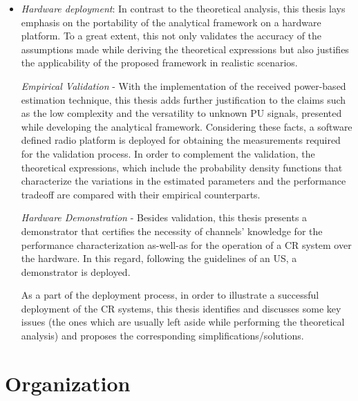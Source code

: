 \begin{itemize}
 
\item \textit{Hardware deployment}: 
In contrast to the theoretical analysis, this thesis lays emphasis on the portability of the analytical framework on a hardware platform. To a great extent, this not only validates the accuracy of the assumptions made while deriving the theoretical expressions but also justifies the applicability of the proposed framework in realistic scenarios. \begin{mdframed}[style=MyFrame] \textit{Empirical Validation} - With the implementation of the received power-based estimation technique, this thesis adds further justification to the claims such as the low complexity and the versatility to unknown PU signals, presented while developing the analytical framework. Considering these facts, a software defined radio platform is deployed for obtaining the measurements required for the validation process. In order to complement the validation, the theoretical expressions, which include the probability density functions that characterize the variations in the estimated parameters and the performance tradeoff are compared with their empirical counterparts. \end{mdframed} \begin{mdframed}[style=MyFrame] \textit{Hardware Demonstration} - Besides validation, this thesis presents a demonstrator that certifies the necessity of channels' knowledge for the performance characterization as-well-as for the operation of a CR system over the hardware. In this regard, following the guidelines of an US, a demonstrator is deployed. \end{mdframed} As a part of the deployment process, %
in order to illustrate a successful deployment of the CR systems, this thesis identifies and discusses some key issues (the ones which are usually left aside while performing the theoretical analysis) and proposes the corresponding simplifications/solutions.  
\end{itemize}

\section{Organization} %

